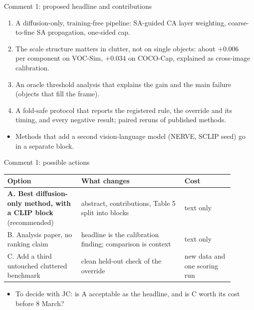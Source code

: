 \begin{frame}{Comment 1: proposed headline and contributions}
\begin{enumerate}
\item A diffusion-only, training-free pipeline: SA-guided CA layer weighting, coarse-to-fine SA propagation, one-sided cap.
\item The scale structure matters in clutter, not on single objects: about $+0.006$ per component on VOC-Sim, $+0.034$ on COCO-Cap, explained as cross-image calibration.
\item An oracle threshold analysis that explains the gain and the main failure (objects that fill the frame).
\item A fold-safe protocol that reports the registered rule, the override and its timing, and every negative result; paired reruns of published methods.
\end{enumerate}
\begin{itemize}
\item Methods that add a second vision-language model (NERVE, SCLIP seed) go in a separate block.
\end{itemize}
\end{frame}

\begin{frame}{Comment 1: possible actions}
\begin{slidetable}
\begin{tabular}{@{}>{\raggedright\arraybackslash}p{0.30\linewidth}>{\raggedright\arraybackslash}p{0.42\linewidth}>{\raggedright\arraybackslash}p{0.20\linewidth}@{}}
\toprule
Option & What changes & Cost \\
\midrule
\textbf{A. Best diffusion-only method, with a CLIP block} (recommended) & abstract, contributions, Table 5 split into blocks & text only \\
B. Analysis paper, no ranking claim & headline is the calibration finding; comparison is context & text only \\
C. Add a third untouched cluttered benchmark & clean held-out check of the override & new data and one scoring run \\
\bottomrule
\end{tabular}
\end{slidetable}
\begin{itemize}
\item To decide with JC: is A acceptable as the headline, and is C worth its cost before 8 March?
\end{itemize}
\end{frame}
